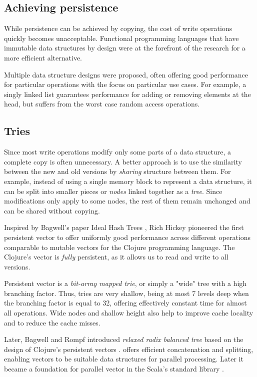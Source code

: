 \subsection{Achieving persistence}
While persistence can be achieved by copying, the cost of write operations quickly becomes unacceptable. Functional programming languages that have immutable data structures by design were at the forefront of the research for a more efficient alternative.

Multiple data structure designs were proposed, often offering good performance for particular operations with the focus on particular use cases. For example, a singly linked list guarantees  performance for adding or removing elements at the head, but suffers from the worst case  random access operations.

\subsection{Tries}
Since most write operations modify only some parts of a data structure, a complete copy is often unnecessary. A better approach is to use the similarity between the new and old versions by \emph{sharing} structure between them. For example, instead of using a single memory block to represent a data structure, it can be split into smaller pieces or \emph{nodes} linked together as a \emph{tree}. Since modifications only apply to some nodes, the rest of them remain unchanged and can be shared without copying.

Inspired by Bagwell's paper Ideal Hash Trees \cite{ideal-hash-trees}, Rich Hickey pioneered the first persistent vector to offer uniformly good performance across different operations comparable to mutable vectors for the Clojure programming language. The Clojure's vector is \emph{fully} persistent, as it allows us to read and write to all versions.

Persistent vector is a \emph{bit-array mapped trie}, or simply a "wide" tree with a high branching factor. Thus, tries are very shallow, being at most 7 levels deep when the branching factor is equal to 32, offering effectively constant time for almost all operations. Wide nodes and shallow height also help to improve cache locality and to reduce the cache misses.

Later, Bagwell and Rompf introduced \emph{relaxed radix balanced tree} based on the design of Clojure's persistent vectors \cite{efficient-immutable-vectors}. \treerrb{} offers efficient concatenation and splitting, enabling vectors to be suitable data structures for parallel processing. Later it became a foundation for parallel vector in the Scala's standard library \cite{rrb-vector-practical-general-purpose-im-sequence}.

